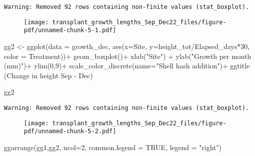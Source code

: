 \documentclass[
  letterpaper,
  DIV=11,
  numbers=noendperiod]{scrartcl}
\newenvironment{Shaded}{\begin{snugshade}}{\end{snugshade}}
\newcommand{\AttributeTok}[1]{\textcolor[rgb]{0.40,0.45,0.13}{#1}}
\newcommand{\ConstantTok}[1]{\textcolor[rgb]{0.56,0.35,0.01}{#1}}
\newcommand{\DecValTok}[1]{\textcolor[rgb]{0.68,0.00,0.00}{#1}}
\newcommand{\FunctionTok}[1]{\textcolor[rgb]{0.28,0.35,0.67}{#1}}
\newcommand{\NormalTok}[1]{\textcolor[rgb]{0.00,0.23,0.31}{#1}}
\newcommand{\OtherTok}[1]{\textcolor[rgb]{0.00,0.23,0.31}{#1}}
\newcommand{\SpecialCharTok}[1]{\textcolor[rgb]{0.37,0.37,0.37}{#1}}
\newcommand{\StringTok}[1]{\textcolor[rgb]{0.13,0.47,0.30}{#1}}
\begin{document}
\begin{verbatim}
Warning: Removed 92 rows containing non-finite values (stat_boxplot).
\end{verbatim}

\begin{figure}[H]

{\centering \texttt{[image: transplant\_growth\_lengths\_Sep\_Dec22\_files/figure-pdf/unnamed-chunk-5-1.pdf]}

}

\end{figure}

\begin{Shaded}
\begin{Highlighting}[]
\NormalTok{gg2 }\OtherTok{\textless{}{-}} \FunctionTok{ggplot}\NormalTok{(}\AttributeTok{data =}\NormalTok{ growth\_dec, }\FunctionTok{aes}\NormalTok{(}\AttributeTok{x=}\NormalTok{Site, }\AttributeTok{y=}\NormalTok{height\_tot}\SpecialCharTok{/}\NormalTok{Elapsed\_days}\SpecialCharTok{*}\DecValTok{30}\NormalTok{, }\AttributeTok{color =}\NormalTok{ Treatment))}\SpecialCharTok{+}
  \FunctionTok{geom\_boxplot}\NormalTok{()}\SpecialCharTok{+}
  \FunctionTok{xlab}\NormalTok{(}\StringTok{"Site"}\NormalTok{) }\SpecialCharTok{+} 
  \FunctionTok{ylab}\NormalTok{(}\StringTok{"Growth per month (mm)"}\NormalTok{)}\SpecialCharTok{+}
  \FunctionTok{ylim}\NormalTok{(}\DecValTok{0}\NormalTok{,}\DecValTok{9}\NormalTok{)}\SpecialCharTok{+}
  \FunctionTok{scale\_color\_discrete}\NormalTok{(}\AttributeTok{name=}\StringTok{"Shell hash addition"}\NormalTok{)}\SpecialCharTok{+}
  \FunctionTok{ggtitle}\NormalTok{ (}\StringTok{\textquotesingle{}Change in height Sep {-} Dec\textquotesingle{}}\NormalTok{)}

\NormalTok{gg2}
\end{Highlighting}
\end{Shaded}

\begin{verbatim}
Warning: Removed 92 rows containing non-finite values (stat_boxplot).
\end{verbatim}

\begin{figure}[H]

{\centering \texttt{[image: transplant\_growth\_lengths\_Sep\_Dec22\_files/figure-pdf/unnamed-chunk-5-2.pdf]}

}

\end{figure}

\begin{Shaded}
\begin{Highlighting}[]
\FunctionTok{ggarrange}\NormalTok{(gg1,gg2, }\AttributeTok{ncol=}\DecValTok{2}\NormalTok{, }\AttributeTok{common.legend =} \ConstantTok{TRUE}\NormalTok{, }\AttributeTok{legend =} \StringTok{"right"}\NormalTok{)}
\end{Highlighting}
\end{Shaded}
\end{document}
